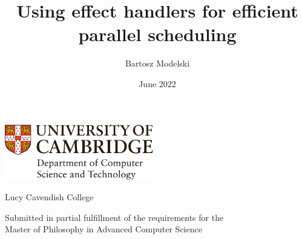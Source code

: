 \documentclass[12pt,a4paper,twoside]{report}
\title{Using effect handlers for efficient parallel scheduling}
\author{Bartosz Modelski}
\date{June 2022}
\newif\ifsubmission %
\newcommand{\candidatenumber}{1234N}
\newcommand{\college}{Lucy Cavendish College}
\newcommand{\course}{Master of Philosophy in Advanced Computer Science}
\begin{document}
\begin{sffamily} %

\begin{titlepage}
\makeatletter

\hspace*{-14mm}\includegraphics[width=65mm]{logo-dcst-colour}

\ifsubmission

\begin{Large}
\vspace{20mm}
Research project report title page

\vspace{35mm}
Candidate \candidatenumber

\vspace{42mm}
\textsl{``\@title''}

\end{Large}

\else

\begin{center}
\Huge
\vspace{\fill}

\@title
\vspace{\fill}

\@author
\vspace{10mm}

\Large
\college
\vspace{\fill}

\@date
\vspace{\fill}

\end{center}

\fi

\vspace{\fill}
\begin{center}
Submitted in partial fulfillment of the requirements for the\\
\course
\end{center}

\makeatother
\end{titlepage}

\newpage


\end{sffamily}
\end{document}
